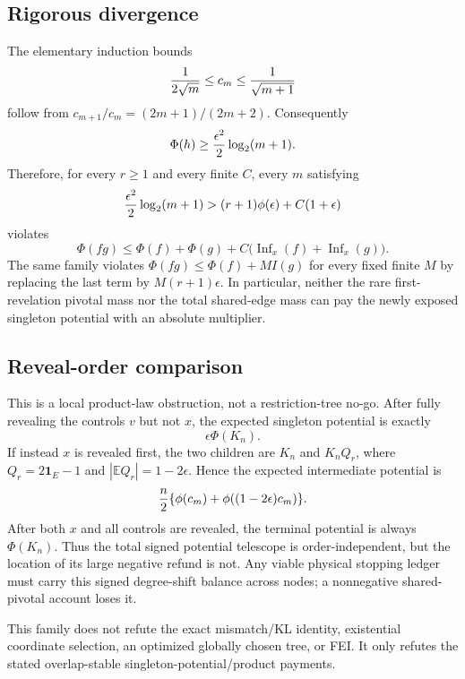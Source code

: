 \subsection*{Rigorous divergence}
The elementary induction bounds
\[
 {1\over2\sqrt m}\le c_m\le {1\over\sqrt{m+1}}
\]
follow from $c_{m+1}/c_m=(2m+1)/(2m+2)$.  Consequently
\[
 \Phi(h)\ge {\epsilon^2\over2}\log_2(m+1).
\]
Therefore, for every $r\ge1$ and every finite $C$, every $m$ satisfying
\[
 {\epsilon^2\over2}\log_2(m+1)>
 (r+1)\phi(\epsilon)+C(1+\epsilon)
\]
violates
\[
 \Phi(fg)\le\Phi(f)+\Phi(g)+C
 \bigl(\operatorname{Inf}_x(f)+\operatorname{Inf}_x(g)\bigr).
\]
The same family violates $\Phi(fg)\le\Phi(f)+M I(g)$ for every fixed
finite $M$ by replacing the last term by $M(r+1)\epsilon$.  In particular,
neither the rare first-revelation pivotal mass nor the total shared-edge mass
can pay the newly exposed singleton potential with an absolute multiplier.

\subsection*{Reveal-order comparison}
This is a local product-law obstruction, not a restriction-tree no-go.
After fully revealing the controls $v$ but not $x$, the expected singleton
potential is exactly
\[
 \epsilon\Phi(K_n).
\]
If instead $x$ is revealed first, the two children are $K_n$ and
$K_nQ_r$, where $Q_r=2\mathbf1_E-1$ and
$|\mathbb E Q_r|=1-2\epsilon$.  Hence the expected intermediate potential is
\[
 {n\over2}\{\phi(c_m)+\phi((1-2\epsilon)c_m)\}.
\]
After both $x$ and all controls are revealed, the terminal potential is
always $\Phi(K_n)$.  Thus the total signed potential telescope is
order-independent, but the location of its large negative refund is not.
Any viable physical stopping ledger must carry this signed degree-shift
balance across nodes; a nonnegative shared-pivotal account loses it.

This family does not refute the exact mismatch/KL identity, existential
coordinate selection, an optimized globally chosen tree, or FEI.  It only
refutes the stated overlap-stable singleton-potential/product payments.
